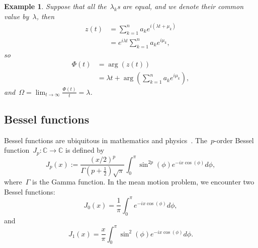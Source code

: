 \documentclass[final ]{IEEEtran}
\newtheorem{theorem}{Theorem}
\newtheorem{example}{Example}
\newcommand {\R}{\mathbb R}
\newcommand {\C}{\mathbb C}
\newcommand{\be}{\begin{equation}}
\newcommand{\ee}{\end{equation}}
\begin{document}
\begin{example}
    Suppose that all 
    the~$\lambda_k$s are equal, and we denote their common value by~$\lambda$, then
\begin{align*}
z(t)&=\sum_{k=1}^n a_ke^{i (\lambda t+\mu_k) }\\
&= e^{i\lambda t} \sum_{k=1}^n a_k e^{i \mu_k },
\end{align*}
so
\begin{align*}
    \Phi(t)&= \arg( z(t))\\&= \lambda t+\arg(\sum_{k=1}^n a_k e^{i \mu_k }) ,    
\end{align*}
and~$\Omega=\lim_{t\to \infty}\frac{\Phi(t)}{t}=\lambda$.
\end{example}

\subsection{Bessel functions}
Bessel functions are ubiquitous in mathematics and physics~\cite{watson}.
The~$p$-order Bessel function~$J_p:\C\to \C$  is defined by 
\be\label{eq:p-bessel}
J_p(x) := \frac {(x/2)^p}{  \Gamma(p+\frac1{2}) \sqrt{\pi}}\int_0^\pi \sin^{2p}(\phi)e^{-ix\cos(\phi)} d\phi,
\ee
where~$\Gamma$ is the Gamma function. In the mean motion problem,  we encounter two Bessel functions: 
\[
J_0(x) =  \frac1{\pi}  \int_0^\pi  e^{-ix\cos(\phi)} d\phi,
\]
and
\[
J_1(x) = \frac { x   }{   \pi} \int_0^\pi \sin^{2 }(\phi)e^{-ix\cos(\phi)} d\phi.
\]

\end{document}
